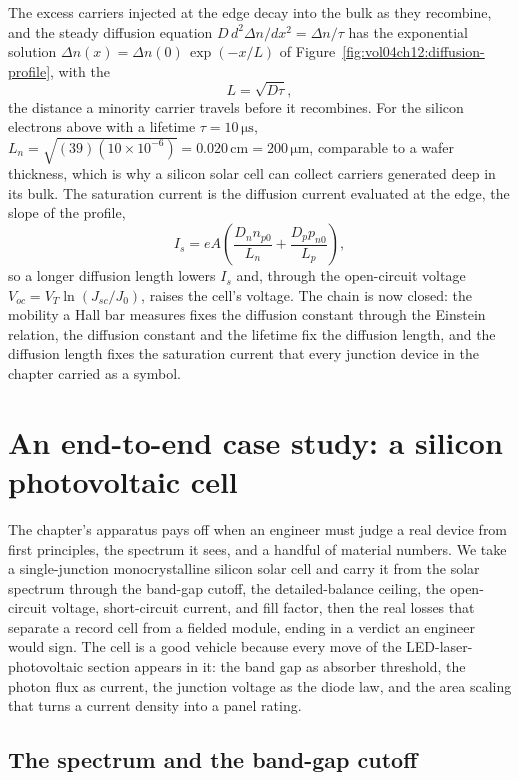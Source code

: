 The excess carriers injected at the edge decay into the bulk as they
recombine, and the steady diffusion equation $D\,d^{2}\Delta n/dx^{2} =
\Delta n/\tau$ has the exponential solution $\Delta n(x) = \Delta n(0)\,
\exp(-x/L)$ of Figure~\ref{fig:vol04ch12:diffusion-profile}, with the
\[
L = \sqrt{D\tau},
\]
the distance a minority carrier travels before it recombines. For the
silicon electrons above with a lifetime $\tau = 10\,\si{\micro\second}$,
$L_n = \sqrt{(39)(10\times 10^{-6})} = 0.020\,\si{\centi\meter} =
200\,\si{\micro\meter}$, comparable to a wafer thickness, which is why a
silicon solar cell can collect carriers generated deep in its bulk. The
saturation current is the diffusion current evaluated at the edge, the slope
of the profile,
\[
I_s = eA\left(\frac{D_n n_{p0}}{L_n} + \frac{D_p p_{n0}}{L_p}\right),
\]
so a longer diffusion length lowers $I_s$ and, through the open-circuit
voltage $V_{oc} = V_T\ln(J_{sc}/J_0)$, raises the cell's voltage. The chain
is now closed: the mobility a Hall bar measures fixes the diffusion constant
through the Einstein relation, the diffusion constant and the lifetime fix
the diffusion length, and the diffusion length fixes the saturation current
that every junction device in the chapter carried as a symbol.



\section{An end-to-end case study: a silicon photovoltaic cell}

The chapter's apparatus pays off when an engineer must judge a real
device from first principles, the spectrum it sees, and a handful of
material numbers. We take a single-junction monocrystalline silicon
solar cell and carry it from the solar spectrum through the band-gap
cutoff, the detailed-balance ceiling, the open-circuit voltage,
short-circuit current, and fill factor, then the real losses that
separate a record cell from a fielded module, ending in a verdict an
engineer would sign. The cell is a good vehicle because every move of
the LED-laser-photovoltaic section appears in it: the band gap as
absorber threshold, the photon flux as current, the junction voltage
as the diode law, and the area scaling that turns a current density
into a panel rating.

\subsection{The spectrum and the band-gap cutoff}

